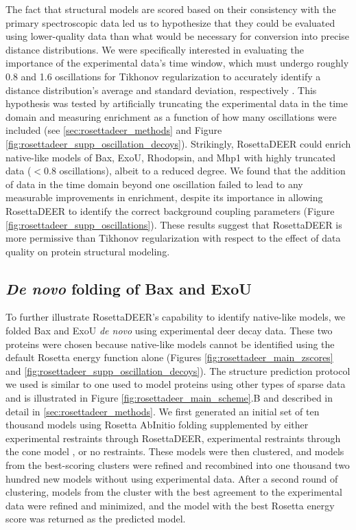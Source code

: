 The fact that structural models are scored based on their consistency with the primary spectroscopic data led us to hypothesize that they could be evaluated using lower-quality data than what would be necessary for conversion into precise distance distributions. We were specifically interested in evaluating the importance of the experimental data’s time window, which must undergo roughly 0.8 and 1.6 oscillations for Tikhonov regularization to accurately identify a distance distribution’s average and standard deviation, respectively \citep*{Jeschke2012}. This hypothesis was tested by artificially truncating the experimental data in the time domain and measuring enrichment as a function of how many oscillations were included (see \ref{sec:rosettadeer_methods} and Figure \ref{fig:rosettadeer_supp_oscillation_decoys}). Strikingly, RosettaDEER could enrich native-like models of Bax, ExoU, Rhodopsin, and Mhp1 with highly truncated data ($\mathrm{<0.8}$ oscillations), albeit to a reduced degree. We found that the addition of data in the time domain beyond one oscillation failed to lead to any measurable improvements in enrichment, despite its importance in allowing RosettaDEER to identify the correct background coupling parameters (Figure \ref{fig:rosettadeer_supp_oscillations}). These results suggest that RosettaDEER is more permissive than Tikhonov regularization with respect to the effect of data quality on protein structural modeling.

\subsection{\emph{De novo} folding of Bax and ExoU}\label{sec:rosettadeer_folding_results}

To further illustrate RosettaDEER’s capability to identify native-like models, we folded Bax and ExoU \emph{de novo} using experimental \gls{deer} decay data. These two proteins were chosen because native-like models cannot be identified using the default Rosetta energy function alone (Figures \ref{fig:rosettadeer_main_zscores} and \ref{fig:rosettadeer_supp_oscillation_decoys}). The structure prediction protocol we used is similar to one used to model proteins using other types of sparse data \citep*{Kim2004, Ovchinnikov2015} and is illustrated in Figure \ref{fig:rosettadeer_main_scheme}.B and described in detail in \ref{sec:rosettadeer_methods}. We first generated an initial set of ten thousand models using Rosetta AbInitio folding supplemented by either experimental restraints through RosettaDEER, experimental restraints through the \gls{cone} model \citep*{Alexander2008}, or no restraints. These models were then clustered, and models from the best-scoring clusters were refined and recombined into one thousand two hundred new models without using experimental data. After a second round of clustering, models from the cluster with the best agreement to the experimental data were refined and minimized, and the model with the best Rosetta energy score was returned as the predicted model. 

